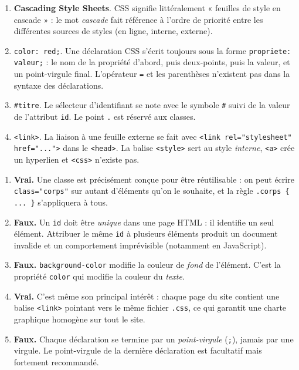 \documentclass[11pt]{article}
\newcommand{\cle}[1]{{\popxbold\color{popdark}#1}}
\begin{document}
\begin{corrige}
\begin{enumerate}[label=\alph*)]
  \item \textbf{Cascading Style Sheets}. \cle{CSS} signifie littéralement « feuilles de style en cascade » : le mot \emph{cascade} fait référence à l'ordre de priorité entre les différentes sources de styles (en ligne, interne, externe).
  \item \texttt{color: red;}. Une déclaration \cle{CSS} s'écrit toujours sous la forme \texttt{propriete: valeur;} : le nom de la propriété d'abord, puis deux-points, puis la valeur, et un point-virgule final. L'opérateur \texttt{=} et les parenthèses n'existent pas dans la syntaxe des déclarations.
  \item \texttt{\#titre}. Le sélecteur d'identifiant se note avec le symbole \texttt{\#} suivi de la valeur de l'attribut \texttt{id}. Le point \texttt{.} est réservé aux classes.
  \item \texttt{<link>}. La liaison à une feuille externe se fait avec \texttt{<link rel="stylesheet" href="...">} dans le \texttt{<head>}. La balise \texttt{<style>} sert au style \emph{interne}, \texttt{<a>} crée un hyperlien et \texttt{<css>} n'existe pas.
\end{enumerate}
\end{corrige}

\begin{corrige}
\begin{enumerate}
  \item \textbf{Vrai.} Une classe est précisément conçue pour être réutilisable : on peut écrire \texttt{class="corps"} sur autant d'éléments qu'on le souhaite, et la règle \texttt{.corps \{ ... \}} s'appliquera à tous.
  \item \textbf{Faux.} Un \texttt{id} doit être \emph{unique} dans une page \cle{HTML} : il identifie un seul élément. Attribuer le même \texttt{id} à plusieurs éléments produit un document invalide et un comportement imprévisible (notamment en \cle{JavaScript}).
  \item \textbf{Faux.} \texttt{background-color} modifie la couleur de \emph{fond} de l'élément. C'est la propriété \texttt{color} qui modifie la couleur du \emph{texte}.
  \item \textbf{Vrai.} C'est même son principal intérêt : chaque page du site contient une balise \texttt{<link>} pointant vers le même fichier \texttt{.css}, ce qui garantit une charte graphique homogène sur tout le site.
  \item \textbf{Faux.} Chaque déclaration se termine par un \emph{point-virgule} (\texttt{;}), jamais par une virgule. Le point-virgule de la dernière déclaration est facultatif mais fortement recommandé.
\end{enumerate}
\end{corrige}
\end{document}
